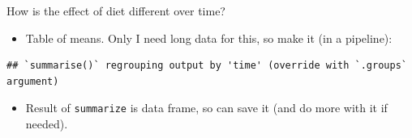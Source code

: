 \documentclass[
  ignorenonframetext,
]{beamer}
\newenvironment{Shaded}{\begin{snugshade}}{\end{snugshade}}
\newcommand{\DataTypeTok}[1]{\textcolor[rgb]{0.13,0.29,0.53}{#1}}
\newcommand{\KeywordTok}[1]{\textcolor[rgb]{0.13,0.29,0.53}{\textbf{#1}}}
\newcommand{\NormalTok}[1]{#1}
\newcommand{\OperatorTok}[1]{\textcolor[rgb]{0.81,0.36,0.00}{\textbf{#1}}}
\newcommand{\StringTok}[1]{\textcolor[rgb]{0.31,0.60,0.02}{#1}}
\providecommand{\tightlist}{%
  \setlength{\itemsep}{0pt}\setlength{\parskip}{0pt}}
\begin{document}
\begin{frame}[fragile]{How is the effect of diet different over time?}
\protect\hypertarget{how-is-the-effect-of-diet-different-over-time}{}

\begin{itemize}
\tightlist
\item
  Table of means. Only I need long data for this, so make it (in a
  pipeline):
\end{itemize}

\begin{Shaded}
\end{Shaded}

\begin{verbatim}
## `summarise()` regrouping output by 'time' (override with `.groups` argument)
\end{verbatim}

\begin{itemize}
\tightlist
\item
  Result of \texttt{summarize} is data frame, so can save it (and do
  more with it if needed).
\end{itemize}

\end{frame}
\end{document}
